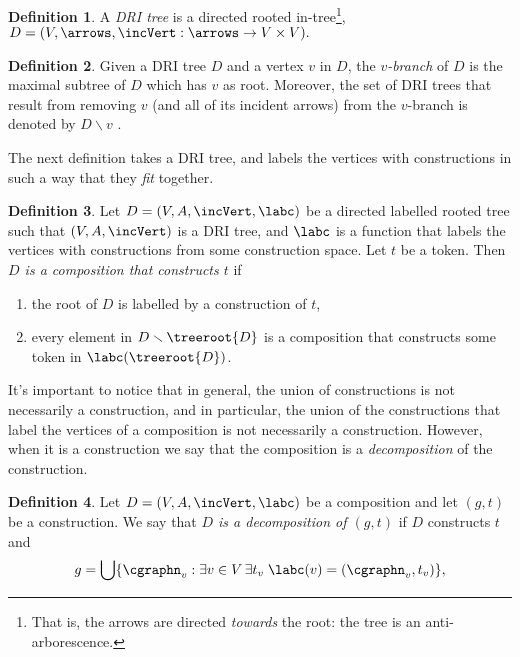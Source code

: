 \documentclass[a4paper]{article}
\theoremstyle{definition}
\newtheorem{definition}{Definition}
\begin{document}
		\begin{definition}\label{defn:decompositionTree}
			A \textit{DRI tree} is a directed rooted in-tree\footnote{That is, the arrows are directed \textit{towards} the root: the tree is an anti-arborescence.},
			$
			D=(V,\arrows, \incVert: \arrows\to V\times V).
			$
		\end{definition}
	\begin{definition}
		Given a DRI tree $D$ and a vertex $v$ in $D$, the \textit{$v$-branch} of $D$ is the maximal subtree of $D$ which has $v$ as root. Moreover, the set of DRI trees that result from removing $v$ (and all of its incident arrows) from the $v$-branch is denoted by $D \smallsetminus v$ .
	\end{definition}
	The next definition takes a DRI tree, and labels the vertices with constructions in such a way that they \textit{fit} together.
	\begin{definition}
		Let $D = (V,A,\incVert,\labc)$ be a directed labelled rooted tree such that $(V,A,\incVert)$ is a DRI tree, and $\labc$ is a function that labels the vertices with constructions from some construction space. Let $t$ be a token. Then \textit{$D$ is a composition that constructs $t$} if
		\begin{enumerate}[itemsep=2pt]
			\item the root of $D$ is labelled by a construction of $t$,
			\item every element in $D \smallsetminus \treeroot{D}$ is a composition that constructs some token in $\labc(\treeroot{D})$.
		\end{enumerate}
	\end{definition}
	It's important to notice that in general, the union of constructions is not necessarily a construction, and in particular, the union of the constructions that label the vertices of a composition is not necessarily a construction. However, when it is a construction we say that the composition is a \textit{decomposition} of the construction.
		
	
		\begin{definition}\label{defn:constructionOfD}
			Let $D = (V,A,\incVert,\labc)$ be a composition and let $(g,t)$ be a construction. We say that \textit{$D$ is a decomposition of $(g,t)$} if $D$ constructs $t$ and 
			\begin{displaymath}
			g=\bigcup \{\cgraphn_v: \exists v\in V \thinspace \exists t_v \thickspace \labc(v)=(\cgraphn_v,t_v)\},
			\end{displaymath}
		\end{definition}
	
\end{document}
